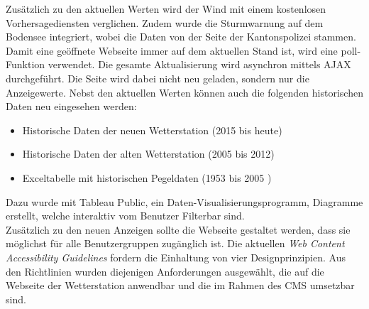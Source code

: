\documentclass[10pt]{article}
\begin{document}
\begin{multicols}{2}
Zusätzlich zu den aktuellen Werten wird der Wind mit einem kostenlosen Vorhersagediensten verglichen. Zudem wurde die Sturmwarnung auf dem Bodensee integriert, wobei die Daten von der Seite der Kantonspolizei stammen. Damit eine geöffnete Webseite immer auf dem aktuellen Stand ist, wird eine poll-Funktion verwendet. Die gesamte Aktualisierung wird asynchron mittels AJAX durchgeführt. Die Seite wird dabei nicht neu geladen, sondern nur die Anzeigewerte. Nebst den aktuellen Werten können auch die folgenden historischen Daten neu eingesehen werden: 
\begin{itemize}
\item Historische Daten der neuen Wetterstation (2015 bis heute)
\item Historische Daten der alten Wetterstation (2005 bis 2012)
\item Exceltabelle mit historischen Pegeldaten (1953 bis 2005 )
\end{itemize}
Dazu wurde mit Tableau Public, ein Daten-Visualisierungsprogramm, Diagramme erstellt, welche interaktiv vom Benutzer Filterbar sind.\\ 
Zusätzlich zu den neuen Anzeigen sollte die Webseite gestaltet werden, dass sie möglichst für alle Benutzergruppen zugänglich ist. Die aktuellen \emph{Web Content Accessibility Guidelines} fordern die Einhaltung von vier Designprinzipien. Aus den Richtlinien wurden diejenigen Anforderungen ausgewählt, die auf die Webseite der Wetterstation anwendbar und die im Rahmen des CMS umsetzbar sind. \\

\end{multicols}
\end{document}
